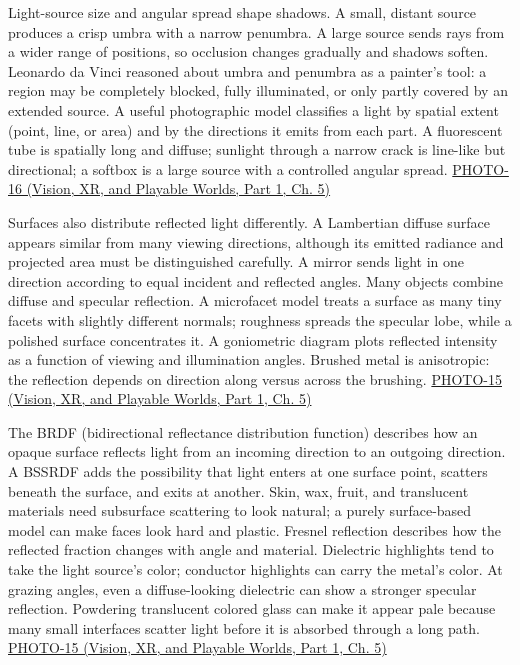 Light-source size and angular spread shape shadows. A small, distant source produces a crisp umbra with a narrow penumbra. A large source sends rays from a wider range of positions, so occlusion changes gradually and shadows soften. Leonardo da Vinci reasoned about umbra and penumbra as a painter's tool: a region may be completely blocked, fully illuminated, or only partly covered by an extended source. A useful photographic model classifies a light by spatial extent (point, line, or area) and by the directions it emits from each part. A fluorescent tube is spatially long and diffuse; sunlight through a narrow crack is line-like but directional; a softbox is a large source with a controlled angular spread. \href{../07-Vision-XR-and-Playable-Worlds-P01/main.pdf\#nameddest=04-visual-computing-ii-ch036-photo-16---photography-session-16}{PHOTO-16 (Vision, XR, and Playable Worlds, Part 1, Ch. 5)}

Surfaces also distribute reflected light differently. A Lambertian diffuse surface appears similar from many viewing directions, although its emitted radiance and projected area must be distinguished carefully. A mirror sends light in one direction according to equal incident and reflected angles. Many objects combine diffuse and specular reflection. A microfacet model treats a surface as many tiny facets with slightly different normals; roughness spreads the specular lobe, while a polished surface concentrates it. A goniometric diagram plots reflected intensity as a function of viewing and illumination angles. Brushed metal is anisotropic: the reflection depends on direction along versus across the brushing. \href{../07-Vision-XR-and-Playable-Worlds-P01/main.pdf\#nameddest=04-visual-computing-ii-ch036-photo-15---photography-session-15}{PHOTO-15 (Vision, XR, and Playable Worlds, Part 1, Ch. 5)}

The BRDF (bidirectional reflectance distribution function) describes how an opaque surface reflects light from an incoming direction to an outgoing direction. A BSSRDF adds the possibility that light enters at one surface point, scatters beneath the surface, and exits at another. Skin, wax, fruit, and translucent materials need subsurface scattering to look natural; a purely surface-based model can make faces look hard and plastic. Fresnel reflection describes how the reflected fraction changes with angle and material. Dielectric highlights tend to take the light source's color; conductor highlights can carry the metal's color. At grazing angles, even a diffuse-looking dielectric can show a stronger specular reflection. Powdering translucent colored glass can make it appear pale because many small interfaces scatter light before it is absorbed through a long path. \href{../07-Vision-XR-and-Playable-Worlds-P01/main.pdf\#nameddest=04-visual-computing-ii-ch036-photo-15---photography-session-15}{PHOTO-15 (Vision, XR, and Playable Worlds, Part 1, Ch. 5)}


